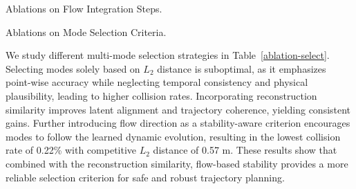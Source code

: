 \begin{table}[!h]
\vspace{-4mm}
    \centering
    
    
    \begin{subtable}{0.48\linewidth}
        \centering
        \setlength{\tabcolsep}{6pt} 
        \caption{Ablations on Flow Integration Steps.}
        \label{ablation-diffusion}
    \end{subtable}
    \hfill
    \begin{subtable}{0.48\linewidth}
        \centering
        \setlength{\tabcolsep}{6pt} 
        \caption{Ablations on Mode Selection Criteria.}
        \label{ablation-select}
    \end{subtable}

    \vspace{-2mm}
    \caption{\textbf{Ablations on Flow Steps and Multi-Mode Selection Strategies.}}
    \vspace{-8mm}
    \label{ablation-diffusion-select}
\end{table}

We study different multi-mode selection strategies in Table~\ref{ablation-select}. Selecting modes solely based on $L_2$ distance is suboptimal, as it emphasizes point-wise accuracy while neglecting temporal consistency and physical plausibility, leading to higher collision rates. 
Incorporating reconstruction similarity improves latent alignment and trajectory coherence, yielding consistent gains. Further introducing flow direction as a stability-aware criterion encourages modes to follow the learned dynamic evolution, resulting in the lowest collision rate of 0.22\% with competitive $L_2$ distance of 0.57 m. 
These results show that combined with the reconstruction similarity, flow-based stability provides a more reliable selection criterion for safe and robust trajectory planning.


